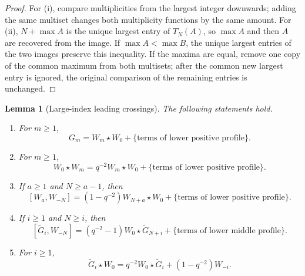 \documentclass[11pt]{extarticle}
\newtheorem{lemma}[theorem]{Lemma}
\theoremstyle{definition}
\theoremstyle{remark}
\numberwithin{equation}{section}
\begin{document}
\begin{proof}
For (i), compare multiplicities from the largest integer downwards; adding
the same multiset changes both multiplicity functions by the same amount.
For (ii), $N+\max A$ is the unique largest entry of $T_N(A)$, so $\max A$
and then $A$ are recovered from the image.  If $\max A<\max B$, the unique
largest entries of the two images preserve this inequality.  If the maxima
are equal, remove one copy of the common maximum from both multisets; after
the common new largest entry is ignored, the original comparison of the
remaining entries is unchanged.
\end{proof}

\begin{lemma}[Large-index leading crossings]
\label{lem:large-crossings}
The following statements hold.
\begin{enumerate}[label=\textup{(\roman*)}]
\item For $m\geq1$,
\begin{equation}
\label{eq:G-leading-positive}
 G_m=W_m\star W_0+
 \{\text{terms of lower positive profile}\}.
\end{equation}
\item For $m\geq1$,
\begin{equation}
\label{eq:W0-Wplus-leading}
 W_0\star W_m=q^{-2}W_m\star W_0+
 \{\text{terms of lower positive profile}\}.
\end{equation}
\item If $a\geq1$ and $N\geq a-1$, then
\begin{equation}
\label{eq:large-W-crossing}
 [W_a,W_{-N}]
 =(1-q^{-2})W_{N+a}\star W_0+
 \{\text{terms of lower positive profile}\}.
\end{equation}
\item If $i\geq1$ and $N\geq i$, then
\begin{equation}
\label{eq:large-tG-crossing}
 [\widetilde G_i,W_{-N}]
 =(q^{-2}-1)W_0\star\widetilde G_{N+i}+
 \{\text{terms of lower middle profile}\}.
\end{equation}
\item For $i\geq1$,
\begin{equation}
\label{eq:tG-W0-exact}
 \widetilde G_i\star W_0
 =q^{-2}W_0\star\widetilde G_i+(1-q^{-2})W_{-i}.
\end{equation}
\end{enumerate}
\end{lemma}
\end{document}
